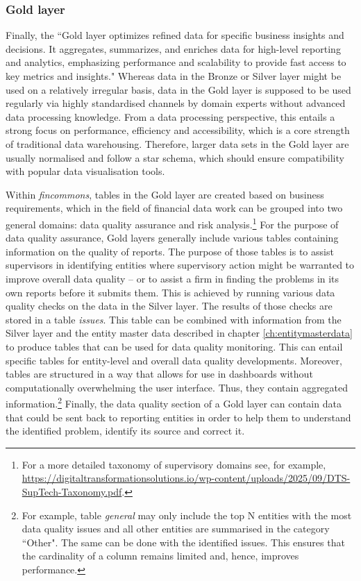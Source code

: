 \documentclass[a4paper, 11pt]{report}
\begin{document}
\subsubsection{Gold layer}

Finally, the ``Gold layer optimizes refined data for specific business insights and decisions. It aggregates, summarizes, and enriches data for high-level reporting and analytics, emphasizing performance and scalability to provide fast access to key metrics and insights."\parencite[p.~5]{Strengholt.2025} Whereas data in the Bronze or Silver layer might be used on a relatively irregular basis, data in the Gold layer is supposed to be used regularly via highly standardised channels by domain experts without advanced data processing knowledge. From a data processing perspective, this entails a strong focus on performance, efficiency and accessibility, which is a core strength of traditional data warehousing. Therefore, larger data sets in the Gold layer are usually normalised and follow a star schema, which should ensure compatibility with popular data visualisation tools.

Within \emph{fincommons}, tables in the Gold layer are created based on business requirements, which in the field of financial data work can be grouped into two general domains: data quality assurance and risk analysis.\footnote{For a more detailed taxonomy of supervisory domains see, for example, \url{https://digitaltransformationsolutions.io/wp-content/uploads/2025/09/DTS-SupTech-Taxonomy.pdf}.} For the purpose of data quality assurance, Gold layers generally include various tables containing information on the quality of reports. The purpose of those tables is to assist supervisors in identifying entities where supervisory action might be warranted to improve overall data quality -- or to assist a firm in finding the problems in its own reports before it submits them. This is achieved by running various data quality checks on the data in the Silver layer. The results of those checks are stored in a table \emph{issues}. This table can be combined with information from the Silver layer and the entity master data described in chapter \ref{ch:entitymasterdata} to produce tables that can be used for data quality monitoring. This can entail specific tables for entity-level and overall data quality developments. Moreover, tables are structured in a way that allows for use in dashboards without computationally overwhelming the user interface. Thus, they contain aggregated information.\footnote{For example, table \emph{general} may only include the top N entities with the most data quality issues and all other entities are summarised in the category ``Other". The same can be done with the identified issues. This ensures that the cardinality of a column remains limited and, hence, improves performance.} Finally, the data quality section of a Gold layer can contain data that could be sent back to reporting entities in order to help them to understand the identified problem, identify its source and correct it.
\end{document}
